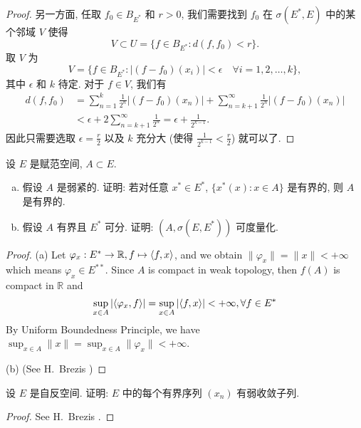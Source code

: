 \begin{proof}
    另一方面, 任取 $f_0\in B_{E^*}$ 和 $r>0$, 我们需要找到 $f_0$ 在
    $\sigma(E^*,E)$ 中的某个邻域 $V$ 使得
    \[V\subset U=\{f\in B_{E^*}\colon d(f,f_0)<r\}.\]
    取 $V$ 为
    \[V = \{f\in B_{E^*}\colon |(f-f_0)(x_i)|<\epsilon
      \quad\forall i=1,2,\dots,k\},\]
    其中 $\epsilon$ 和 $k$ 待定. 对于 $f\in V$, 我们有
    \begin{align*}
      d(f,f_0)
      & = \sum_{n=1}^k \frac{1}{2^n}|(f-f_0)(x_n)|
          + \sum_{n=k+1}^{\infty} \frac{1}{2^n}|(f-f_0)(x_n)| \\
      & < \epsilon + 2\sum_{n=k+1}^{\infty} \frac{1}{2^n}
        = \epsilon + \frac{1}{2^{k-1}}.
    \end{align*}
    因此只需要选取 $\epsilon=\frac{r}{2}$ 以及 $k$ 充分大 (使得 $\frac{1}{2^{k-1}}<\frac{r}{2}$)
    就可以了.
\end{proof}


\begin{exercise}
    设 $E$ 是赋范空间, $A\subset E$.
  \begin{enumerate}[(a)]
    \item 假设 $A$ 是弱紧的. 证明: 若对任意 $x^*\in E^*$,
      $\{x^*(x)\colon x\in A\}$ 是有界的, 则 $A$ 是有界的.
    \item 假设 $A$ 有界且 $E^*$ 可分. 证明: $(A, \sigma(E, E^*))$ 可度量化.
  \end{enumerate}
\end{exercise}

\begin{proof}
    (a) Let $\varphi_x : E^*\to \mathbb R,f\mapsto \langle f,x\rangle$, and we obtain $\|\varphi_x\| = \|x\| < +\infty$ which means $\varphi_x\in E^{**}$. Since $A$ is compact in weak topology, then $f(A)$ is compact in $\mathbb R$ and 
    \[ \sup_{x\in A}|\langle\varphi_x,f\rangle| = \sup_{x\in A} |\langle f,x\rangle| < +\infty, \forall f \in E^* \]
    By Uniform Boundedness Principle, we have $\sup_{x\in A}\|x\| = \sup_{x\in A} \|\varphi_x\| < +\infty$. 
        
    (b) (See H.~Brezis \cite[Theorem 3.29]{brezis_functional_2011}) 
\end{proof}


\begin{exercise}
  设 $E$ 是自反空间. 证明: $E$ 中的每个有界序列 $(x_n)$ 有弱收敛子列.
\end{exercise}

\begin{proof}
  See H.~Brezis \cite[Theorem 3.18]{brezis_functional_2011}.
\end{proof}


